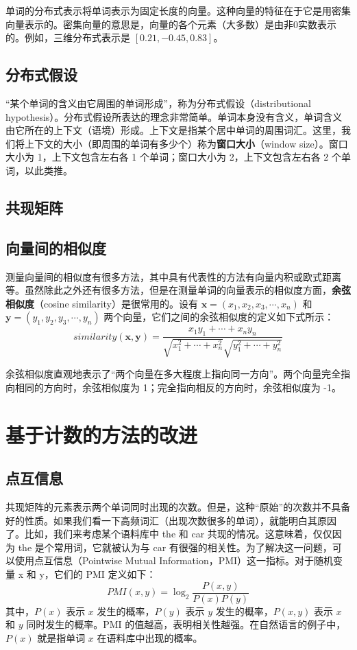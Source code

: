 单词的分布式表示将单词表示为固定长度的向量。这种向量的特征在于它是用密集向量表示的。密集向量的意思是，向量的各个元素（大多数）是由非0实数表示的。例如，三维分布式表示是 $[0.21,-0.45,0.83]$。
\subsection{分布式假设}
“某个单词的含义由它周围的单词形成”，称为分布式假设（distributional hypothesis）。分布式假设所表达的理念非常简单。单词本身没有含义，单词含义由它所在的上下文（语境）形成。上下文是指某个居中单词的周围词汇。这里，我们将上下文的大小（即周围的单词有多少个）称为\textbf{窗口大小}（window size）。窗口大小为 1，上下文包含左右各 1 个单词；窗口大小为 2，上下文包含左右各 2 个单词，以此类推。
\subsection{共现矩阵}

\subsection{向量间的相似度}
测量向量间的相似度有很多方法，其中具有代表性的方法有向量内积或欧式距离等。虽然除此之外还有很多方法，但是在测量单词的向量表示的相似度方面，\textbf{余弦相似度}（cosine similarity）是很常用的。设有 $\bm{x} = (x_1, x_2, x_3,\cdots , x_n)$ 和 $\bm{y} = (y_1, y_2, y_3,\cdots, y_n)$ 两个向量，它们之间的余弦相似度的定义如下式所示：
\begin{equation}
    similarity(\bm{x},\bm{y})=\frac{x_1y_1+\cdots+x_ny_n}{\sqrt{x_1^2+\cdots+x_n^2}\sqrt{y_1^2+\cdots+y_n^2}}
\end{equation}

余弦相似度直观地表示了“两个向量在多大程度上指向同一方向”。两个向量完全指向相同的方向时，余弦相似度为 1；完全指向相反的方向时，余弦相似度为 -1。
\section{基于计数的方法的改进}
\subsection{点互信息}
共现矩阵的元素表示两个单词同时出现的次数。但是，这种“原始”的次数并不具备好的性质。如果我们看一下高频词汇（出现次数很多的单词），就能明白其原因了。比如，我们来考虑某个语料库中 the 和 car 共现的情况。这意味着，仅仅因为 the 是个常用词，它就被认为与 car 有很强的相关性。为了解决这一问题，可以使用点互信息（Pointwise Mutual Information，PMI）这一指标。对于随机变量 x 和 y，它们的 PMI 定义如下：
\begin{equation}
    PMI(x, y)=\log_2\frac{P(x, y)}{P(x)P(y)}
\end{equation}
其中，$P(x)$ 表示 $x$ 发生的概率，$P(y)$ 表示 $y$ 发生的概率，$P(x, y)$ 表示 $x$ 和 $y$ 同时发生的概率。PMI 的值越高，表明相关性越强。在自然语言的例子中，$P(x)$ 就是指单词 $x$ 在语料库中出现的概率。

